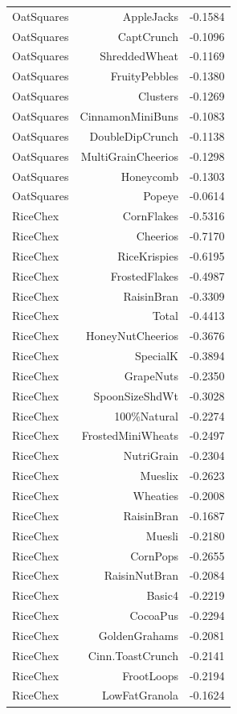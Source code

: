 \begin{longtable}{@{}lrr@{}}
OatSquares & AppleJacks & -0.1584 \\
OatSquares & CaptCrunch & -0.1096 \\
OatSquares & ShreddedWheat & -0.1169 \\
OatSquares & FruityPebbles & -0.1380 \\
OatSquares & Clusters & -0.1269 \\
OatSquares & CinnamonMiniBuns & -0.1083 \\
OatSquares & DoubleDipCrunch & -0.1138 \\
OatSquares & MultiGrainCheerios & -0.1298 \\
OatSquares & Honeycomb & -0.1303 \\
OatSquares & Popeye & -0.0614 \\
RiceChex & CornFlakes & -0.5316 \\
RiceChex & Cheerios & -0.7170 \\
RiceChex & RiceKrispies & -0.6195 \\
RiceChex & FrostedFlakes & -0.4987 \\
RiceChex & RaisinBran & -0.3309 \\
RiceChex & Total & -0.4413 \\
RiceChex & HoneyNutCheerios & -0.3676 \\
RiceChex & SpecialK & -0.3894 \\
RiceChex & GrapeNuts & -0.2350 \\
RiceChex & SpoonSizeShdWt & -0.3028 \\
RiceChex & 100\%Natural & -0.2274 \\
RiceChex & FrostedMiniWheats & -0.2497 \\
RiceChex & NutriGrain & -0.2304 \\
RiceChex & Mueslix & -0.2623 \\
RiceChex & Wheaties & -0.2008 \\
RiceChex & RaisinBran & -0.1687 \\
RiceChex & Muesli & -0.2180 \\
RiceChex & CornPops & -0.2655 \\
RiceChex & RaisinNutBran & -0.2084 \\
RiceChex & Basic4 & -0.2219 \\
RiceChex & CocoaPus & -0.2294 \\
RiceChex & GoldenGrahams & -0.2081 \\
RiceChex & Cinn.ToastCrunch & -0.2141 \\
RiceChex & FrootLoops & -0.2194 \\
RiceChex & LowFatGranola & -0.1624 \\

\end{longtable}
